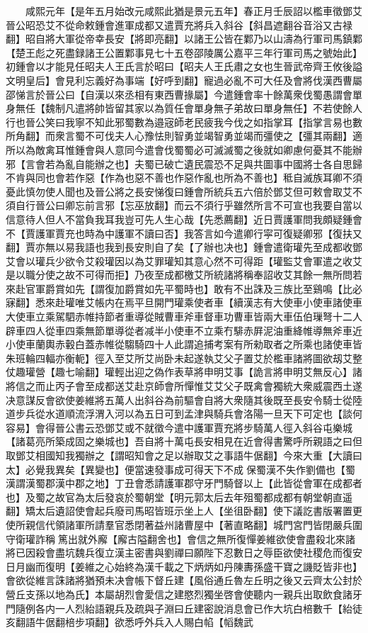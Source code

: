 　　咸熙元年【是年五月始改元咸熙此猶是景元五年】春正月壬辰詔以檻車徵鄧艾晉公昭恐艾不從命敕鍾會進軍成都又遣賈充將兵入斜谷【斜昌遮翻谷音浴又古禄翻】昭自將大軍從帝幸長安【將即亮翻】以諸王公皆在鄴乃以山濤為行軍司馬鎮鄴【楚王彪之死盡録諸王公置鄴事見七十五卷邵陵厲公嘉平三年行軍司馬之號始此】初鍾會以才能見任昭夫人王氏言於昭曰【昭夫人王氏肅之女也生晉武帝齊王攸後謚文明皇后】會見利忘義好為事端【好呼到翻】寵過必亂不可大任及會將伐漢西曹屬邵悌言於晉公曰【自漢以來丞相有東西曹掾屬】今遣鍾會率十餘萬衆伐蜀愚謂會單身無任【魏制凡遣將帥皆留其家以為質任會單身無子弟故曰單身無任】不若使餘人行也晉公笑曰我寧不知此邪蜀數為邉宼師老民疲我今伐之如指掌耳【指掌言易也數所角翻】而衆言蜀不可伐夫人心豫怯則智勇並竭智勇並竭而彊使之【彊其兩翻】適所以為敵禽耳惟鍾會與人意同今遣會伐蜀蜀必可滅滅蜀之後就如卿慮何憂其不能辦邪【言會若為亂自能辦之也】夫蜀已破亡遺民震恐不足與共圖事中國將士各自思歸不肯與同也會若作惡【作為也惡不善也作惡作亂也所為不善也】秪自滅族耳卿不須憂此慎勿使人聞也及晉公將之長安悌復曰鍾會所統兵五六倍於鄧艾但可敕會取艾不須自行晉公曰卿忘前言邪【忘巫放翻】而云不須行乎雖然所言不可宣也我要自當以信意待人但人不當負我耳我豈可先人生心哉【先悉薦翻】近日賈護軍問我頗疑鍾會不【賈護軍賈充也時為中護軍不讀曰否】我答言如今遣卿行寜可復疑卿邪【復扶又翻】賈亦無以易我語也我到長安則自了矣【了辦也决也】鍾會遣衛瓘先至成都收鄧艾會以瓘兵少欲令艾殺瓘因以為艾罪瓘知其意心然不可得距【瓘監艾會軍遣之收艾是以職分使之故不可得而拒】乃夜至成都檄艾所統諸將稱奉詔收艾其餘一無所問若來赴官軍爵賞如先【謂復加爵賞如先平蜀時也】敢有不出誅及三族比至鷄鳴【比必寐翻】悉來赴瓘唯艾帳内在焉平旦開門瓘乘使者車【續漢志有大使車小使車諸使車大使車立乘駕駟赤帷持節者重導從賊曹車斧車督車功曹車皆兩大車伍伯璅弩十二人辟車四人從車四乘無節單導從者减半小使車不立乘冇騑赤屛泥油重絳帷導無斧車近小使車蘭輿赤轂白蓋赤帷從騶騎四十人此謂追捕考案有所勑取者之所乘也諸使車皆朱班輪四輻亦衡軛】徑入至艾所艾尚卧未起遂執艾父子置艾於檻車諸將圖欲刼艾整仗趣瓘營【趣七喻翻】瓘輕出迎之偽作表草將申明艾事【詭言將申明艾無反心】諸將信之而止丙子會至成都送艾赴京師會所憚惟艾艾父子既禽會獨統大衆威震西土遂决意謀反會欲使姜維將五萬人出斜谷為前驅會自將大衆隨其後既至長安令騎士從陸道步兵從水道順流浮渭入河以為五日可到孟津與騎兵會洛陽一旦天下可定也【談何容易】會得晉公書云恐鄧艾或不就徵今遣中護軍賈充將步騎萬人徑入斜谷屯樂城【諸葛亮所築成固之樂城也】吾自將十萬屯長安相見在近會得書驚呼所親語之曰但取鄧艾相國知我獨辦之【謂昭知會之足以辦取艾之事語牛倨翻】今來大重【大讀曰太】必覺我異矣【異變也】便當速發事成可得天下不成保蜀漢不失作劉備也【蜀漢謂漢蜀郡漢中郡之地】丁丑會悉請護軍郡守牙門騎督以上【此皆從會軍在成都者也】及蜀之故官為太后發哀於蜀朝堂【明元郭太后去年殂蜀都成都有朝堂朝直遥翻】矯太后遺詔使會起兵廢司馬昭皆班示坐上人【坐徂卧翻】使下議訖書版署置更使所親信代領諸軍所請羣官悉閉著益州諸曹屋中【著直略翻】城門宮門皆閉嚴兵圍守衛瓘詐稱篤出就外廨【廨古隘翻舍也】會信之無所復憚姜維欲使會盡殺北來諸將已因殺會盡坑魏兵復立漢主密書與劉禪曰願陛下忍數日之辱臣欲使社稷危而復安日月幽而復明【姜維之心始終為漢千載之下炳炳如丹陳夀孫盛干寶之譏貶皆非也】會欲從維言誅諸將猶預未决會帳下督丘建【風俗通丘魯左丘明之後又云齊太公封於營丘支孫以地為氏】本屬胡烈會愛信之建愍烈獨坐啓會使聽内一親兵出取飲食諸牙門隨例各内一人烈紿語親兵及疏與子淵曰丘建密說消息會已作大坑白棓數千【紿徒亥翻語牛倨翻棓步項翻】欲悉呼外兵入人賜白㡊【幍魏武